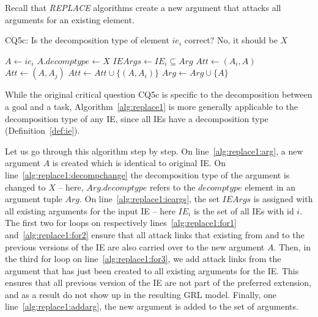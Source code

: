 Recall that \emph{REPLACE} algorithms create a new argument that attacks all arguments for an existing element.

\begin{algorithm}[h]
  \caption{CQ5c: Is the decomposition type of element $ie_i$ correct? No, it should be $X$ }\label{alg:replace1}
  \begin{algorithmic}[1]
    \State $A \leftarrow ie_i$\label{alg:replace1:arg}
    \State $A.decomptype\leftarrow X$\label{alg:replace1:decompchange}
    \State $IEArgs\leftarrow IE_i\subseteq  Arg$\label{alg:replace1:ieargs}
    \label{alg:replace1:for1}
      \State $Att\leftarrow (A_i,A)$
    \EndFor
    \label{alg:replace1:for2}
      \State $Att\leftarrow (A,A_j)$
    \label{alg:replace1:for3}
      \State $Att \leftarrow Att \cup \{(A,A_i)\}$\label{alg:replace1:att}
    \EndFor
    \EndFor
    \State $Arg\leftarrow Arg \cup \{A\}$\label{alg:replace1:addarg}
    \EndProcedure
  \end{algorithmic}
\end{algorithm}

While the original critical question CQ5c is specific to the decomposition between a goal and a task, Algorithm~\ref{alg:replace1} is more generally applicable to the decomposition type of any IE, since all IEs have a decomposition type (Definition~\ref{def:ie}). 

Let us go through this algorithm step by step. On line~\ref{alg:replace1:arg}, a new argument $A$ is created which is identical to original IE. On line~\ref{alg:replace1:decompchange} the decomposition type of the argument is changed to $X$ -- here, $Arg.decomptype$ refers to the $decomptype$ element in an argument tuple $Arg$. On line~\ref{alg:replace1:ieargs}, the set $IEArgs$ is assigned with all existing arguments for the input IE -- here $IE_i$ is the set of all IEs with id $i$. The first two for loops on respectively lines~\ref{alg:replace1:for1} and~\ref{alg:replace1:for2} ensure that all attack links that existing from and to the previous versions of the IE are also carried over to the new argument $A$. Then, in the third for loop on line~\ref{alg:replace1:for3}, we add attack links from the argument that has just been created to all existing arguments for the IE. This ensures that all previous version of the IE are not part of the preferred extension, and as a result do not show up in the resulting GRL model. Finally, one line~\ref{alg:replace1:addarg}, the new argument is added to the set of arguments.

